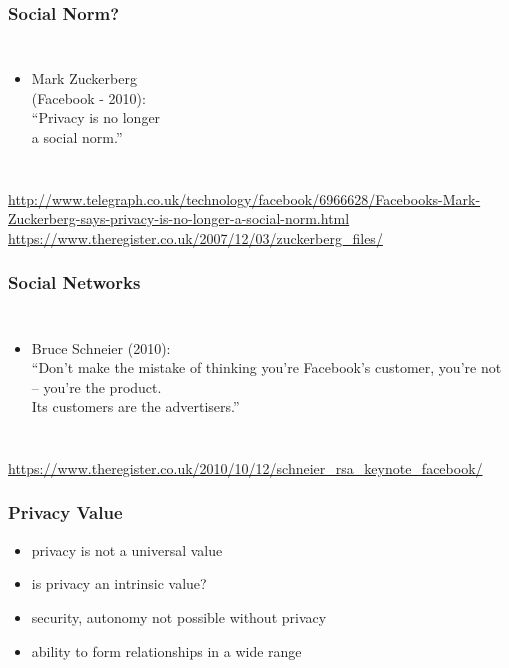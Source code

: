 \documentclass[dvipsnames]{beamer}
\theoremstyle{plain}
\begin{document}
\begin{frame}
  \frametitle{Social Norm?}

  \begin{columns}

    \begin{itemize}
      \item Mark Zuckerberg\\
        (Facebook - 2010):\\
        \smallskip
        ``Privacy is no longer\\
          a social norm.''
    \end{itemize}
  \end{columns}

  \medskip
  \tiny{\url{http://www.telegraph.co.uk/technology/facebook/6966628/Facebooks-Mark-Zuckerberg-says-privacy-is-no-longer-a-social-norm.html}}\\
  \smallskip
  \tiny{\url{https://www.theregister.co.uk/2007/12/03/zuckerberg_files/}}\\
\end{frame}


\begin{frame}
  \frametitle{Social Networks}

  \begin{columns}

    \begin{itemize}
      \item Bruce Schneier (2010):\\
      \smallskip
      ``Don't make the mistake of thinking you're Facebook's customer,
      you're not\\
      -- you're the product.\\
      \smallskip
      Its customers are the advertisers.''
    \end{itemize}
  \end{columns}

  \medskip
  \tiny{\url{https://www.theregister.co.uk/2010/10/12/schneier_rsa_keynote_facebook/}}\\
\end{frame}

\begin{frame}
  \frametitle{Privacy Value}

  \begin{itemize}
    \item privacy is not a universal value

    \pause
    \bigskip
    \item is privacy an intrinsic value?
    \smallskip
    \item security, autonomy not possible without privacy
    \item ability to form relationships in a wide range
  \end{itemize}
\end{frame}
\end{document}
